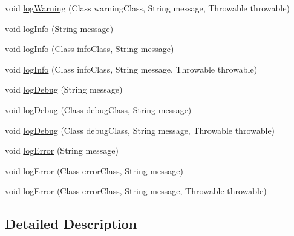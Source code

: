 \begin{DoxyCompactItemize}
\item 
void \mbox{\hyperlink{classcom_1_1dlinkddns_1_1atulsaurabh_1_1erpecosystem_1_1logger_1_1_erp_ecosystem_logger_a432114edc56c223b7b5764348641ea24}{log\+Warning}} (Class warning\+Class, String message, Throwable throwable)
\item 
void \mbox{\hyperlink{classcom_1_1dlinkddns_1_1atulsaurabh_1_1erpecosystem_1_1logger_1_1_erp_ecosystem_logger_a25071d05590b133a88f8b2f35092ebd7}{log\+Info}} (String message)
\item 
void \mbox{\hyperlink{classcom_1_1dlinkddns_1_1atulsaurabh_1_1erpecosystem_1_1logger_1_1_erp_ecosystem_logger_a70838215b194b2f9771cec61a7f660c0}{log\+Info}} (Class info\+Class, String message)
\item 
void \mbox{\hyperlink{classcom_1_1dlinkddns_1_1atulsaurabh_1_1erpecosystem_1_1logger_1_1_erp_ecosystem_logger_ad6718b3031cb8032127659aeac49d803}{log\+Info}} (Class info\+Class, String message, Throwable throwable)
\item 
void \mbox{\hyperlink{classcom_1_1dlinkddns_1_1atulsaurabh_1_1erpecosystem_1_1logger_1_1_erp_ecosystem_logger_a220bd030f8fe67c986972c3925727196}{log\+Debug}} (String message)
\item 
void \mbox{\hyperlink{classcom_1_1dlinkddns_1_1atulsaurabh_1_1erpecosystem_1_1logger_1_1_erp_ecosystem_logger_a80d54c08b8d233dc1782e1f85bdde19a}{log\+Debug}} (Class debug\+Class, String message)
\item 
void \mbox{\hyperlink{classcom_1_1dlinkddns_1_1atulsaurabh_1_1erpecosystem_1_1logger_1_1_erp_ecosystem_logger_a40e19afc6e72a31339e4eec00132c166}{log\+Debug}} (Class debug\+Class, String message, Throwable throwable)
\item 
void \mbox{\hyperlink{classcom_1_1dlinkddns_1_1atulsaurabh_1_1erpecosystem_1_1logger_1_1_erp_ecosystem_logger_ab9553bd3b9e717accdc9c2d0ee13371e}{log\+Error}} (String message)
\item 
void \mbox{\hyperlink{classcom_1_1dlinkddns_1_1atulsaurabh_1_1erpecosystem_1_1logger_1_1_erp_ecosystem_logger_aa561000b385ff39f9d8171a91e831c2d}{log\+Error}} (Class error\+Class, String message)
\item 
void \mbox{\hyperlink{classcom_1_1dlinkddns_1_1atulsaurabh_1_1erpecosystem_1_1logger_1_1_erp_ecosystem_logger_a25316b3eabb66eaecba45d638c420b2b}{log\+Error}} (Class error\+Class, String message, Throwable throwable)
\end{DoxyCompactItemize}


\subsection{Detailed Description}
